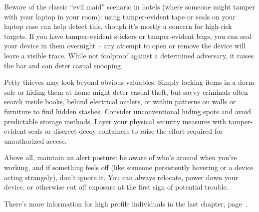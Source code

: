 Beware of the classic ``evil maid'' scenario in hotels
(where someone might tamper with your laptop in your
room): using tamper-evident tape or seals on your laptop
case can help detect this, though it's mostly a concern
for high-risk targets. If you have tamper-evident stickers
or tamper-evident bags, you can seal your device in them
overnight -- any attempt to open or remove the device will
leave a visible trace. While not foolproof against a
determined adversary, it raises the bar and can deter
casual snooping.

Petty thieves may look beyond obvious valuables. Simply
locking items in a dorm safe or hiding them at home might
deter casual theft, but savvy criminals often search
inside books, behind electrical outlets, or within
patterns on walls or furniture to find hidden stashes.
Consider unconventional hiding spots and avoid predictable
storage methods. Layer your physical security measures
with tamper-evident seals or discreet decoy containers to
raise the effort required for unauthorized access.

Above all, maintain an alert posture: be aware of who's
around when you're working, and if something feels off
(like someone persistently hovering or a device acting
strangely), don't ignore it. You can always relocate,
power down your device, or otherwise cut off exposure at
the first sign of potential trouble.

There's more information for high profile individuals in
the last chapter, page~\pageref{ch:high-profile}.
